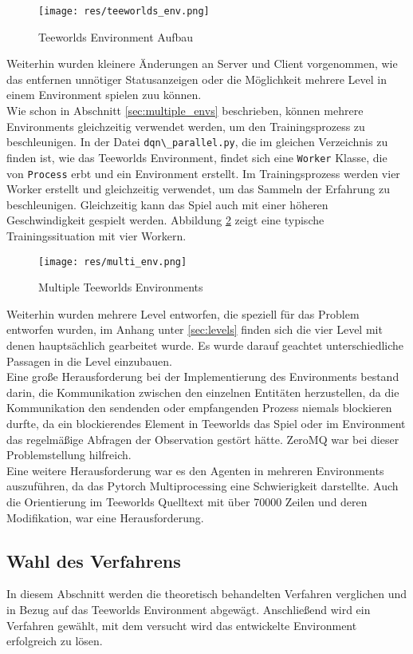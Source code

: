 \documentclass[11pt]{scrartcl}
\begin{document}
\begin{figure}[htp]
  \centering
  \texttt{[image: res/teeworlds\_env.png]}
  \caption{Teeworlds Environment Aufbau}
  \label{fig:teeworlds_env}
\end{figure}
\noindent
Weiterhin wurden kleinere Änderungen an Server und Client vorgenommen, wie das entfernen
unnötiger Statusanzeigen oder die Möglichkeit mehrere Level in einem Environment spielen
zuu können.\\
Wie schon in Abschnitt \ref{sec:multiple_envs} beschrieben, können mehrere Environments
gleichzeitig verwendet werden, um den Trainingsprozess zu beschleunigen. In der Datei
\lstinline!dqn\_parallel.py!, die im gleichen Verzeichnis zu finden ist, wie das Teeworlds
Environment, findet sich eine \lstinline!Worker! Klasse, die von \lstinline!Process! erbt
und ein Environment erstellt. Im Trainingsprozess werden vier Worker erstellt und
gleichzeitig verwendet, um das Sammeln der Erfahrung zu beschleunigen. Gleichzeitig kann
das Spiel auch mit einer höheren Geschwindigkeit gespielt werden. Abbildung
\ref{fig:multi_env} zeigt eine typische Trainingssituation mit vier Workern.

\begin{figure}[htp]
  \centering
  \texttt{[image: res/multi\_env.png]}
  \caption{Multiple Teeworlds Environments}
  \label{fig:multi_env}
\end{figure}
\noindent
Weiterhin wurden mehrere Level entworfen, die speziell für das Problem entworfen wurden,
im Anhang unter \ref{sec:levels} finden sich die vier Level mit denen hauptsächlich
gearbeitet wurde. Es wurde darauf geachtet unterschiedliche Passagen in die Level
einzubauen.\\
Eine große Herausforderung bei der Implementierung des Environments bestand darin, die
Kommunikation zwischen den einzelnen Entitäten herzustellen, da die Kommunikation den
sendenden oder empfangenden Prozess niemals blockieren durfte, da ein blockierendes
Element in Teeworlds das Spiel oder im Environment das regelmäßige Abfragen der
Observation gestört hätte. ZeroMQ war bei dieser Problemstellung hilfreich.\\
Eine weitere Herausforderung war es den Agenten in mehreren Environments auszuführen, da
das Pytorch Multiprocessing eine Schwierigkeit darstellte. Auch die Orientierung im
Teeworlds Quelltext mit über 70000 Zeilen und deren Modifikation, war eine
Herausforderung.

\subsection{Wahl des Verfahrens}
In diesem Abschnitt werden die theoretisch behandelten Verfahren verglichen und in Bezug
auf das Teeworlds Environment abgewägt. Anschließend wird ein Verfahren gewählt, mit dem
versucht wird das entwickelte Environment erfolgreich zu lösen.\\
\end{document}

